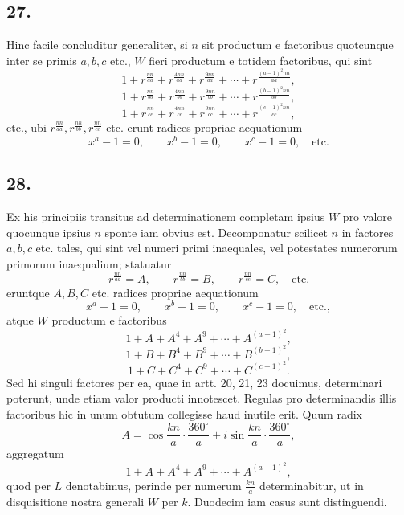 \documentclass[12pt]{article}
\begin{document}
\subsection*{27.}

Hinc facile concluditur generaliter, si $n$ sit productum e factoribus quotcunque inter se primis $a,b,c$ etc., $W$ fieri productum e totidem factoribus, qui sint
\[
1+r^{\frac{nn}{aa}}+r^{\frac{4nn}{aa}}+r^{\frac{9nn}{aa}}+\cdots+r^{\frac{(a-1)^2nn}{aa}},
\]
\[
1+r^{\frac{nn}{bb}}+r^{\frac{4nn}{bb}}+r^{\frac{9nn}{bb}}+\cdots+r^{\frac{(b-1)^2nn}{bb}},
\]
\[
1+r^{\frac{nn}{cc}}+r^{\frac{4nn}{cc}}+r^{\frac{9nn}{cc}}+\cdots+r^{\frac{(c-1)^2nn}{cc}},
\]
etc., ubi $r^{\frac{nn}{aa}},r^{\frac{nn}{bb}},r^{\frac{nn}{cc}}$ etc. erunt radices propriae aequationum
\[
x^a-1=0,\qquad x^b-1=0,\qquad x^c-1=0,\quad\text{etc.}
\]

\subsection*{28.}

Ex his principiis transitus ad determinationem completam ipsius $W$ pro valore quocunque ipsius $n$ sponte iam obvius est. Decomponatur scilicet $n$ in factores $a,b,c$ etc. tales, qui sint vel numeri primi inaequales, vel potestates numerorum primorum inaequalium; statuatur
\[
r^{\frac{nn}{aa}}=A,\qquad r^{\frac{nn}{bb}}=B,\qquad r^{\frac{nn}{cc}}=C,\quad\text{etc.}
\]
eruntque $A,B,C$ etc. radices propriae aequationum
\[
x^a-1=0,\qquad x^b-1=0,\qquad x^c-1=0,\quad\text{etc.},
\]
atque $W$ productum e factoribus
\[
1+A+A^4+A^9+\cdots+A^{(a-1)^2},
\]
\[
1+B+B^4+B^9+\cdots+B^{(b-1)^2},
\]
\[
1+C+C^4+C^9+\cdots+C^{(c-1)^2}.
\]
Sed hi singuli factores per ea, quae in artt. 20, 21, 23 docuimus, determinari poterunt, unde etiam valor producti innotescet. Regulas pro determinandis illis factoribus hic in unum obtutum collegisse haud inutile erit. Quum radix
\[
A=\cos\frac{kn}{a}\cdot\frac{360^\circ}{a}+i\sin\frac{kn}{a}\cdot\frac{360^\circ}{a},
\]
aggregatum
\[
1+A+A^4+A^9+\cdots+A^{(a-1)^2},
\]
quod per $L$ denotabimus, perinde per numerum $\frac{kn}{a}$ determinabitur, ut in disquisitione nostra generali $W$ per $k$. Duodecim iam casus sunt distinguendi.
\end{document}

